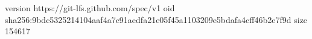 version https://git-lfs.github.com/spec/v1
oid sha256:9bdc5325214104aaf4a7c91aedfa21e05f45a1103209e5bdafa4cff46b2e7f9d
size 154617
